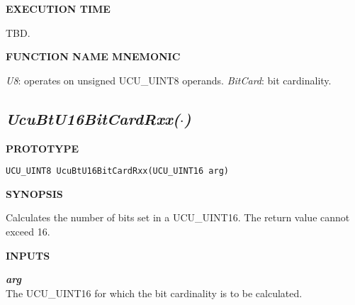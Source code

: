 \noindent\textbf{EXECUTION TIME}
\begin{list}{}{\setlength{\leftmargin}{0.25in}\setlength{\topsep}{0.0in}}
\item TBD.
\end{list}
\vspace{2.8ex}

\noindent\textbf{FUNCTION NAME MNEMONIC}
\begin{list}{}{\setlength{\leftmargin}{0.25in}\setlength{\topsep}{0.0in}}
\item \emph{U8}: operates on unsigned UCU\_UINT8 operands.
      \emph{BitCard}: bit cardinality.
\end{list}


\subsection[\emph{UcuBtU16BitCardRxx(\protect\mbox{\protect$\cdot$})}]
           {\emph{UcuBtU16BitCardRxx(\protect\mbox{\protect\boldmath $\cdot$})}}
\label{cbsf0:sbcf0:sbcs0}

%

\noindent\textbf{PROTOTYPE}
\begin {list}{}{\setlength{\leftmargin}{0.25in}\setlength{\topsep}{0.0in}}
\item
\begin{verbatim}
UCU_UINT8 UcuBtU16BitCardRxx(UCU_UINT16 arg)
\end{verbatim}
\end{list}
\vspace{2.8ex}

\noindent\textbf{SYNOPSIS}
\begin{list}{}{\setlength{\leftmargin}{0.25in}\setlength{\topsep}{0.0in}}
\item Calculates the number of bits set in a UCU\_UINT16.  The return value cannot
      exceed 16.
\end{list}
\vspace{2.8ex}

\noindent\textbf{INPUTS}
\begin{list}{}{\setlength{\leftmargin}{0.5in}\setlength{\itemindent}{-0.25in}\setlength{\topsep}{0.0in}\setlength{\partopsep}{0.0in}}
\item \emph{\textbf{arg}}\\
      The UCU\_UINT16 for which the bit cardinality is to be calculated.
\end{list}
\vspace{2.8ex}

